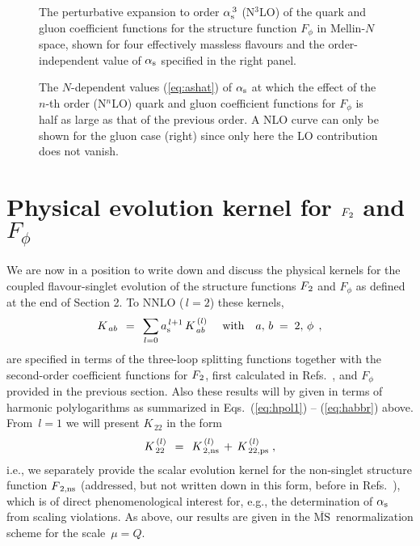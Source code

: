 \documentclass[12pt]{article}
\newcommand{\beq}{\begin{equation}}
\newcommand{\eeq}{\end{equation}}
\newcommand{\MSb}{$\overline{\mbox{MS}}$}
\newcommand{\as}{\alpha_{\rm s}}
\newcommand{\ar}{a_{\rm s}}
\begin{document}
\begin{figure}[p]
\vspace*{-1mm}
\centerline{}
\vspace{-2mm}
\caption{\label{pic:fig4}
 The perturbative expansion to order $\as^{\,3}$ (N$^3$LO) of the quark and 
 gluon coefficient functions for the structure function $F_\phi$ in Mellin-$N$
 space, shown for four effectively massless flavours and the order-independent 
 value of $\as$ specified in the right panel.
 }
\end{figure}
%
\begin{figure}[p]
\centerline{}
\vspace{-2mm}
\caption{\label{pic:fig5}
 The $N$-dependent values (\ref{eq:ashat}) of $\as$ at which the effect of the 
 $n$-th order (N$^n$LO) quark and gluon coefficient functions for $F_\phi$ is 
 half as large as that of the previous order. A NLO curve can only be shown for
 the gluon case (right) since only here the LO contribution does not vanish.
 }
\vspace{-1mm}
\end{figure}
%
%
\setcounter{equation}{0}
\section{Physical evolution kernel for ${F_{\:\! 2}}$ and $F_{\phi}$}
\label{sec:kernel}
%
%
We are now in a position to write down and discuss the physical kernels for the
coupled flavour-singlet evolution of the structure functions ${F_{\:\! 2}}$ and 
$F_{\phi}$ as defined at the end of Section 2. To NNLO ($\,l = 2$) these 
kernels,
%
\beq 
\label{eq:Kabexp} 
  K_{\,ab} \:\: = \:\: \sum_{l=0} \ar^{\,l+1}\, K_{\,ab}^{\,(l)} 
  \quad \mbox{ with} \quad a,\, b \; =\; 2,\, \phi
  \:\: ,
\eeq
%
are specified in terms of the three-loop splitting functions \cite{MVV3,MVV4}
together with the second-order coefficient functions for ${F_{\:\! 2}}$, first 
calculated in Refs.~\cite{ZvN-F2}, and $F_\phi$ provided in the previous 
section. Also these results will by given in terms of harmonic polylogarithms 
\cite{Remiddi:1999ew} as summarized in Eqs.\ (\ref{eq:hpol1}) -- (\ref{eq:habbr})
above. From $\,l = 1$ we will present $K_{\,22}$ in the form
%
\beq
\label{eq:K22nsps}
   K_{\,22}^{\,(l)} \:\: = \:\: K_{\,2,\rm ns }^{\,(l)} \,+\,
   K_{\,22, \rm ps}^{\,(l)} \; ,
\eeq
%
i.e., we separately provide the scalar evolution kernel for the non-singlet 
structure function $F_{\,2,\rm ns}$ (addressed, but not written down in this 
form, before in Refs.~\cite{NV3,MV5}), which is of direct phenomenological 
interest for, e.g., the determination of $\as$ from scaling violations. As
above, our results are given in the \MSb\ renormalization scheme for the 
scale $\,\mu = Q$.
\end{document}
